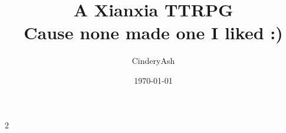 \documentclass{article}
\title{A Xianxia TTRPG \\
    \large Cause none made one I liked :)}
\author{CinderyAsh}
\date{\today}
\begin{document}
\maketitle

    


    \begin{multicols}{2}
        
        
        
        
        
        
        
    \end{multicols}
\end{document}
